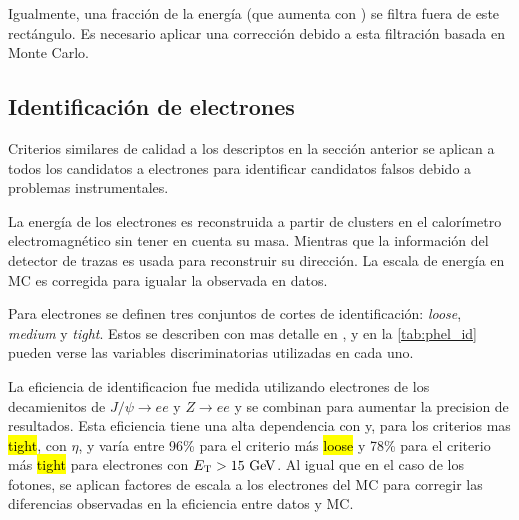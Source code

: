 Igualmente, una fracción de la energía (que aumenta con {\pt}) se filtra fuera de
este rectángulo. Es necesario aplicar una corrección debido a esta filtración
basada en Monte Carlo.







\subsection{Identificación de electrones}
\label{sec:elec_obj}

Criterios similares de calidad a los descriptos en la sección anterior
se aplican a todos los candidatos a electrones para identificar candidatos
falsos debido a problemas instrumentales.

La energía de los electrones es reconstruida a partir de clusters en el calorímetro
electromagnético sin tener en cuenta su masa. Mientras que la información del
detector de trazas es usada para reconstruir su dirección. La escala de energía
en MC es corregida para igualar la observada en datos.

Para electrones se definen tres conjuntos de cortes de identificación: \emph{loose}, \emph{medium} y
\emph{tight}. Estos se describen con mas detalle en \cite{ATL-PHYS-PUB-2011-007}, y
en la \cref{tab:phel_id} pueden verse las variables discriminatorias utilizadas
en cada uno.

La eficiencia de identificacion fue medida utilizando electrones de los
decamienitos de $J/\psi\to ee$ y $Z\to ee$ y se combinan para aumentar la
precision de resultados. Esta eficiencia tiene una alta dependencia con {\et} y, para
los criterios mas \hl{tight}, con $\eta$, y varía entre 96\% para el criterio
más \hl{loose} y 78\% para el criterio más \hl{tight} para electrones con $\et>15\gev$.
Al igual que en el caso de los fotones, se aplican factores de escala
a los electrones del MC para corregir las diferencias observadas en la
eficiencia entre datos y MC.



